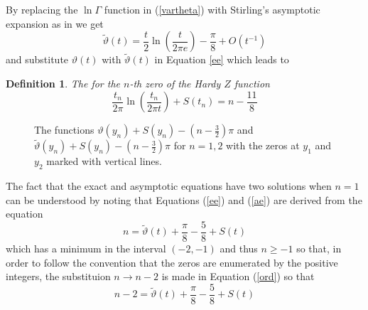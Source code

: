 \documentclass{elsarticle}
\newcommand{\tmverbatim}[1]{{\ttfamily{#1}}}
\newtheorem{definition}{Definition}
\begin{document}
By replacing the $\ln \Gamma$ function in (\ref{vartheta}) with Stirling's
asymptotic expansion as in {\cite[Equation 13]{z0t}} we get
\begin{equation}
  \tilde{\vartheta} (t) = \frac{t}{2} \ln \left( \frac{t}{2 \pi e} \right) -
  \frac{\pi}{8} + O (t^{- 1})
\end{equation}
and substitute $\vartheta (t)$ with $\tilde{\vartheta} (t)$ in Equation
\ref{ee} which leads to

\begin{definition}
  The \tmverbatim{asymptotic equation} for the $n$-th zero of the Hardy $Z$
  function
  \begin{equation}
    \frac{t_n}{2 \pi} \ln \left( \frac{t_n}{2 \pi t} \right) + S (t_n) = n -
    \frac{11}{8} \label{ae}
  \end{equation}
  {\cite[Equation 20]{z0t}}
\end{definition}

\begin{figure}[h]
  \caption{The functions $\vartheta (y_n) + S (y_n) - \left( n - \frac{3}{2}
  \right) \pi$ and $\tilde{\vartheta} (y_n) + S (y_n) - \left( n - \frac{3}{2}
  \right) \pi$ for $n = 1, 2$ with the zeros at $y_1$ and $y_2$ marked with
  vertical lines. }
\end{figure}

\begin{remark}
  The fact that the exact and asymptotic equations have two solutions when $n
  = 1$ can be understood by noting that Equations (\ref{ee}) and (\ref{ae})
  are derived from the equation
  \begin{equation}
    n = \tilde{\vartheta} (t) + \frac{\pi}{8} - \frac{5}{8} + S (t_{})
    \label{ord}
  \end{equation}
  which has a minimum in the interval $(- 2, - 1)$ and thus $n \geqslant - 1$
  so that, in order to follow the convention that the zeros are enumerated by
  the positive integers, the substituion $n \rightarrow n - 2$ is made in
  Equation (\ref{ord}) so that
  \begin{equation}
    n - 2 = \tilde{\vartheta} (t) + \frac{\pi}{8} - \frac{5}{8} + S (t_{})
  \end{equation}
  {\cite[Equation 12]{z0t}}
\end{remark}
\end{document}
